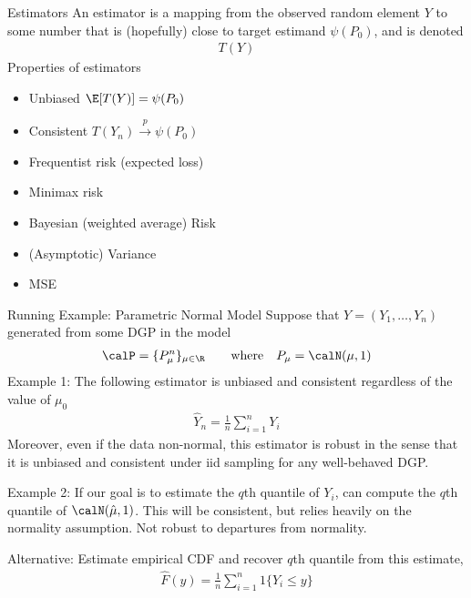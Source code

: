 \documentclass[aspectratio=169, handout]{beamer}
\newcommand{\pto}{\xrightarrow{p}}
\newcommand{\sumin}{\sum^n_{i=1}}
\begin{document}
{\footnotesize
\begin{frame}{Estimators}
An \alert{estimator} is a \alert{mapping} from the observed random
element $Y$ to some number that is (hopefully) close to target estimand
$\psi(P_0)$, and is denoted
\begin{align*}
  {T}(Y)
\end{align*}
\pause
Properties of estimators
\begin{itemize}
  \item Unbiased $\E[T(Y)]=\psi(P_0)$
  \item Consistent $T(Y_n)\pto \psi(P_0)$
  \item Frequentist risk (expected loss)
  \item Minimax risk
  \item Bayesian (weighted average) Risk
  \item (Asymptotic) Variance
  \item MSE
\end{itemize}
\end{frame}
}

{\footnotesize
\begin{frame}{Running Example: Parametric Normal Model}
Suppose that $Y=(Y_1,\ldots,Y_n)$ generated from some DGP in the model
\begin{align*}
  \calP = \{P_\mu^n\}_{\mu\in \R}
  \qquad\text{where}\quad
  P_\mu = \calN(\mu,1)
\end{align*}
\pause
\alert{Example 1}:
The following estimator is \alert{unbiased} and \alert{consistent}
regardless of the value of $\mu_0$
\begin{align*}
  \hat{Y}_n
  =
  \frac{1}{n}
  \sumin
  Y_i
\end{align*}
\pause
Moreover, even if the data non-normal, this estimator is \alert{robust} in the
sense that it is unbiased and consistent under iid sampling for
\alert{any} well-behaved DGP.
\pause

\alert{Example 2}:
If our goal is to estimate the $q$th quantile of $Y_i$, can
compute the $q$th quantile of $\calN(\hat{\mu},1)$.
This will be consistent, but relies heavily on the normality assumption.
\alert{Not robust} to departures from normality.

\pause
Alternative: Estimate empirical CDF and recover $q$th quantile from this
estimate,
\begin{align*}
  \hat{F}(y)
  =
  \frac{1}{n}
  \sumin
  {1}\{Y_i\leq y\}
\end{align*}
\end{frame}
}
\end{document}
